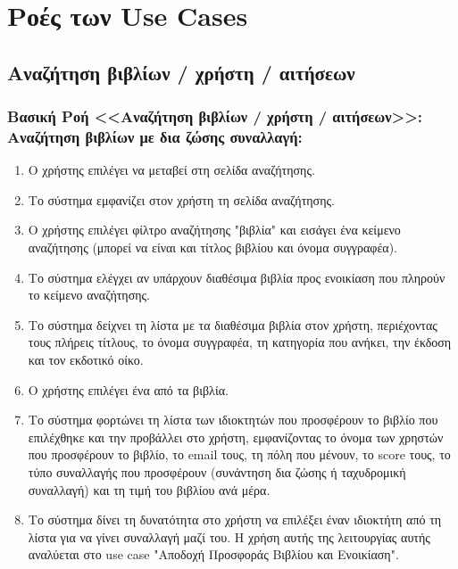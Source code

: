\documentclass[12pt,a4paper]{article}
\begin{document}
\section{Ροές των Use Cases}
\label{Ροές των Use Cases}

\subsection{Αναζήτηση βιβλίων / χρήστη / αιτήσεων}

\subsubsection*{Βασική Ροή <<Αναζήτηση βιβλίων / χρήστη / αιτήσεων>>: Αναζήτηση βιβλίων με δια ζώσης συναλλαγή:}
\begin{enumerate}
    \item Ο χρήστης επιλέγει να μεταβεί στη σελίδα αναζήτησης.
    \item Το σύστημα εμφανίζει στον χρήστη τη σελίδα αναζήτησης.
    \item Ο χρήστης επιλέγει φίλτρο αναζήτησης "βιβλία" και εισάγει ένα κείμενο αναζήτησης (μπορεί να είναι και τίτλος βιβλίου και όνομα συγγραφέα).
        \label{Επιλογή τύπου αναζήτησης}
    \item Το σύστημα ελέγχει αν υπάρχουν διαθέσιμα βιβλία προς ενοικίαση που πληρούν το κείμενο αναζήτησης.
        \label{Ύπαρξη βιβλίου}
    \item Το σύστημα δείχνει τη λίστα με τα διαθέσιμα βιβλία στον χρήστη, περιέχοντας τους πλήρεις τίτλους, το όνομα συγγραφέα, τη κατηγορία που ανήκει, την έκδοση και τον εκδοτικό οίκο.
    \item Ο χρήστης επιλέγει ένα από τα βιβλία.
    \item Το σύστημα φορτώνει τη λίστα των ιδιοκτητών που προσφέρουν το βιβλίο που επιλέχθηκε και την προβάλλει στο χρήστη, εμφανίζοντας το όνομα των χρηστών που προσφέρουν το βιβλίο, το email τους, τη πόλη που μένουν, το score τους, το τύπο συναλλαγής που προσφέρουν (συνάντηση δια ζώσης ή ταχυδρομική συναλλαγή) και τη τιμή του βιβλίου ανά μέρα. 
    \item Το σύστημα δίνει τη δυνατότητα στο χρήστη να επιλέξει έναν ιδιοκτήτη από τη λίστα για να γίνει συναλλαγή μαζί του. Η χρήση αυτής της λειτουργίας αυτής αναλύεται στο use case "Αποδοχή Προσφοράς Βιβλίου και Ενοικίαση".
\end{enumerate}
\end{document}
